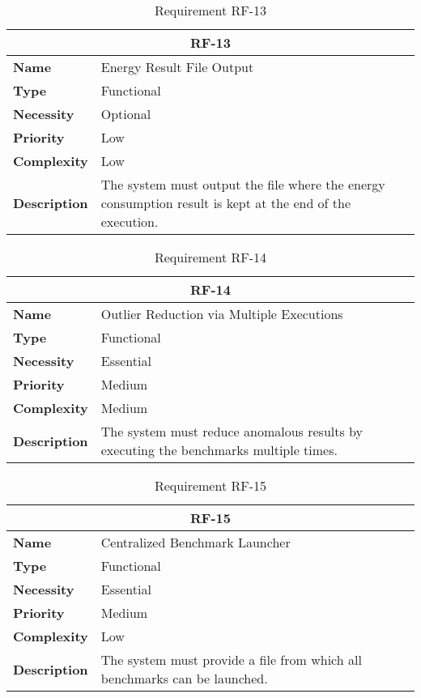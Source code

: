 \begin{table}[H]
    \centering
    \begin{tabular}{l p{10cm}}
        \toprule
        \multicolumn{2}{c}{\textbf{RF-13}} \\
        \toprule
        \textbf{Name}               & Energy Result File Output \\
        \textbf{Type}               & Functional \\
        \textbf{Necessity}          & Optional \\
        \textbf{Priority}           & Low \\
        \textbf{Complexity}         & Low \\
        \textbf{Description}        & The system must output the file where the energy consumption result is kept at the end of the execution. \\
        \bottomrule
    \end{tabular}
\caption{Requirement RF-13}\label{tab:rf-13}
\end{table}

\begin{table}[H]
    \centering
    \begin{tabular}{l p{10cm}}
        \toprule
        \multicolumn{2}{c}{\textbf{RF-14}} \\
        \toprule
        \textbf{Name}               & Outlier Reduction via Multiple Executions \\
        \textbf{Type}               & Functional \\
        \textbf{Necessity}          & Essential \\
        \textbf{Priority}           & Medium \\
        \textbf{Complexity}         & Medium \\
        \textbf{Description}        & The system must reduce anomalous results by executing the benchmarks multiple times. \\
        \bottomrule
    \end{tabular}
\caption{Requirement RF-14}\label{tab:rf-14}
\end{table}

\begin{table}[H]
    \centering
    \begin{tabular}{l p{10cm}}
        \toprule
        \multicolumn{2}{c}{\textbf{RF-15}} \\
        \toprule
        \textbf{Name}               & Centralized Benchmark Launcher \\
        \textbf{Type}               & Functional \\
        \textbf{Necessity}          & Essential \\
        \textbf{Priority}           & Medium \\
        \textbf{Complexity}         & Low \\
        \textbf{Description}        & The system must provide a file from which all benchmarks can be launched. \\
        \bottomrule
    \end{tabular}
\caption{Requirement RF-15}\label{tab:rf-15}
\end{table}

